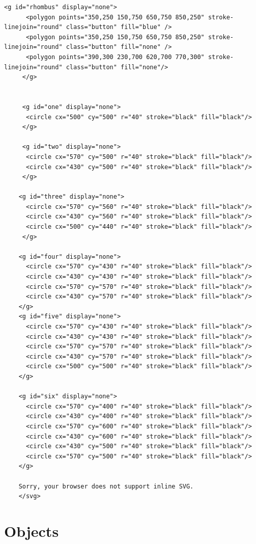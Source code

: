 \begin{lstlisting}[style=TypeScript, caption={SVG Image File}, label={lst:svgimagefile}]
     <g id="rhombus" display="none">
      <polygon points="350,250 150,750 650,750 850,250" stroke-linejoin="round" class="button" fill="blue" />
      <polygon points="350,250 150,750 650,750 850,250" stroke-linejoin="round" class="button" fill="none" />
      <polygon points="390,300 230,700 620,700 770,300" stroke-linejoin="round" class="button" fill="none"/>
     </g>


     <g id="one" display="none">
      <circle cx="500" cy="500" r="40" stroke="black" fill="black"/>
     </g>

     <g id="two" display="none">
      <circle cx="570" cy="500" r="40" stroke="black" fill="black"/>
      <circle cx="430" cy="500" r="40" stroke="black" fill="black"/>
     </g>

    <g id="three" display="none">
      <circle cx="570" cy="560" r="40" stroke="black" fill="black"/>
      <circle cx="430" cy="560" r="40" stroke="black" fill="black"/>
      <circle cx="500" cy="440" r="40" stroke="black" fill="black"/>
     </g>

    <g id="four" display="none">
      <circle cx="570" cy="430" r="40" stroke="black" fill="black"/>
      <circle cx="430" cy="430" r="40" stroke="black" fill="black"/>
      <circle cx="570" cy="570" r="40" stroke="black" fill="black"/>
      <circle cx="430" cy="570" r="40" stroke="black" fill="black"/>
    </g>
    <g id="five" display="none">
      <circle cx="570" cy="430" r="40" stroke="black" fill="black"/>
      <circle cx="430" cy="430" r="40" stroke="black" fill="black"/>
      <circle cx="570" cy="570" r="40" stroke="black" fill="black"/>
      <circle cx="430" cy="570" r="40" stroke="black" fill="black"/>
      <circle cx="500" cy="500" r="40" stroke="black" fill="black"/>
    </g>

    <g id="six" display="none">
      <circle cx="570" cy="400" r="40" stroke="black" fill="black"/>
      <circle cx="430" cy="400" r="40" stroke="black" fill="black"/>
      <circle cx="570" cy="600" r="40" stroke="black" fill="black"/>
      <circle cx="430" cy="600" r="40" stroke="black" fill="black"/>
      <circle cx="430" cy="500" r="40" stroke="black" fill="black"/>
      <circle cx="570" cy="500" r="40" stroke="black" fill="black"/>
    </g>

    Sorry, your browser does not support inline SVG.
    </svg>

\end{lstlisting}

\section{Objects}\label{sec:objects}
